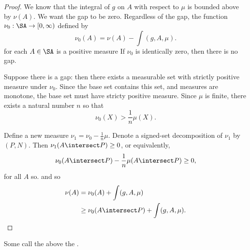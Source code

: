 \begin{prop}
\begin{proof}
  We know that the integral of
  $g$ on $A$ with respect to $\mu$
  is bounded above by $\nu(A)$.
  We want the gap to be zero.
  Regardless of the gap, the function
  $\nu_0: \SA \to [0, \infty)$ defined
  by
  \[
    \nu_0(A) = \nu(A) - \int(g, A, \mu).
  \]
  for each $A \in \SA$ is a positive measure
  If $\nu_0$ is identically zero,
  then there is no gap.

  Suppose there is a gap:
  then there exists a measurable
  set with strictly positive measure
  under $\nu_0$.
  Since the base set contains this
  set, and measures are monotone,
  the base set must have stricty
  positive measure.
  Since $\mu$ is finite, there exists
  a natural number $n$ so that
  \[
    \nu_0(X) > \frac{1}{n}\mu(X).
  \]

  Define a new measure $\nu_1 = \nu_0 - \frac{1}{n}\mu$.
  Denote a signed-set decomposition of $\nu_1$
  by $(P, N)$.
  Then $\nu_1(A \intersect P) \geq 0$, or equivalently,
  \[
    \nu_0(A \intersect P) - \frac{1}{n}\mu(A \intersect P) \geq 0,
  \]
  for all $A$ so.
  and so
  \[
    \begin{aligned}
      \nu(A) &=    \nu_0(A) + \int(g, A, \mu) \\
             &\geq \nu_0(A \intersect P) + \int (g, A, \mu).
    \end{aligned}
  \]
\end{proof}
\end{prop}

Some call the above the
.


\strats
